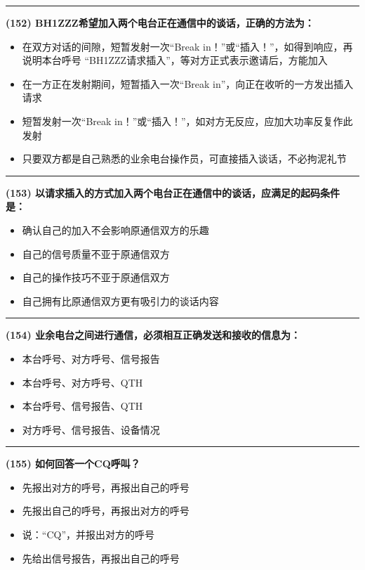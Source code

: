 \documentclass[twocolumn]{ctexart}  %
\begin{document}
\noindent\rule{0.5\textwidth}{1pt}
\heiti \textbf{(152) BH1ZZZ希望加入两个电台正在通信中的谈话，正确的方法为：} \songti {\color{gray} [LK0244] }
\begin{itemize}
	\item  在双方对话的间隙，短暂发射一次“Break in！”或“插入！”，如得到响应，再说明本台呼号 “BH1ZZZ请求插入”，等对方正式表示邀请后，方能加入
	\item  在一方正在发射期间，短暂插入一次“Break in”，向正在收听的一方发出插入请求
	\item  短暂发射一次“Break in！”或“插入！”，如对方无反应，应加大功率反复作此发射
	\item  只要双方都是自己熟悉的业余电台操作员，可直接插入谈话，不必拘泥礼节
\end{itemize}


\noindent\rule{0.5\textwidth}{1pt}
\heiti \textbf{(153) 以请求插入的方式加入两个电台正在通信中的谈话，应满足的起码条件是：} \songti {\color{gray} [LK0245] }
\begin{itemize}
	\item  确认自己的加入不会影响原通信双方的乐趣
	\item  自己的信号质量不亚于原通信双方
	\item  自己的操作技巧不亚于原通信双方
	\item  自己拥有比原通信双方更有吸引力的谈话内容
\end{itemize}


\noindent\rule{0.5\textwidth}{1pt}
\heiti \textbf{(154) 业余电台之间进行通信，必须相互正确发送和接收的信息为：} \songti {\color{gray} [LK1046] }
\begin{itemize}
	\item  本台呼号、对方呼号、信号报告
	\item  本台呼号、对方呼号、QTH
	\item  本台呼号、信号报告、QTH
	\item  对方呼号、信号报告、设备情况
\end{itemize}


\noindent\rule{0.5\textwidth}{1pt}
\heiti \textbf{(155) 如何回答一个CQ呼叫？} \songti {\color{gray} [LK1097] }
\begin{itemize}
	\item  先报出对方的呼号，再报出自己的呼号
	\item  先报出自己的呼号，再报出对方的呼号
	\item  说：“CQ”，并报出对方的呼号
	\item  先给出信号报告，再报出自己的呼号
\end{itemize}
\end{document}
